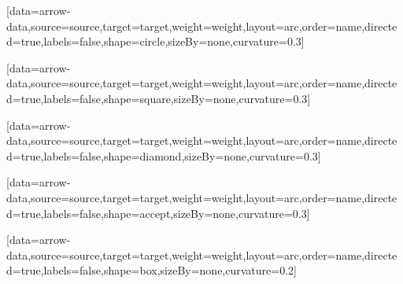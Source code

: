 \documentclass[type=paper,language=en]{semio}
\begin{document}
\begin{VizFigure}[width=80,height=40][data=arrow-data,source=source,target=target,weight=weight,layout=arc,order=name,directed=true,labels=false,shape=circle,sizeBy=none,curvature=0.3]\end{VizFigure}
\begin{VizFigure}[width=80,height=40][data=arrow-data,source=source,target=target,weight=weight,layout=arc,order=name,directed=true,labels=false,shape=square,sizeBy=none,curvature=0.3]\end{VizFigure}
\begin{VizFigure}[width=80,height=40][data=arrow-data,source=source,target=target,weight=weight,layout=arc,order=name,directed=true,labels=false,shape=diamond,sizeBy=none,curvature=0.3]\end{VizFigure}
\begin{VizFigure}[width=80,height=40][data=arrow-data,source=source,target=target,weight=weight,layout=arc,order=name,directed=true,labels=false,shape=accept,sizeBy=none,curvature=0.3]\end{VizFigure}
\begin{VizFigure}[width=80,height=40][data=arrow-data,source=source,target=target,weight=weight,layout=arc,order=name,directed=true,labels=false,shape=box,sizeBy=none,curvature=0.2]\end{VizFigure}
\end{document}
